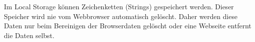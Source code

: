 \label{sec:localstorage}

Im Local Storage können Zeichenketten (Strings) gespeichert werden. 
Dieser Speicher wird nie vom Webbrowser automatisch gelöscht. 
Daher werden diese Daten nur beim Bereinigen der Browserdaten gelöscht oder eine Webseite entfernt die Daten selbst. 
\cite{w3LocalStorage}

